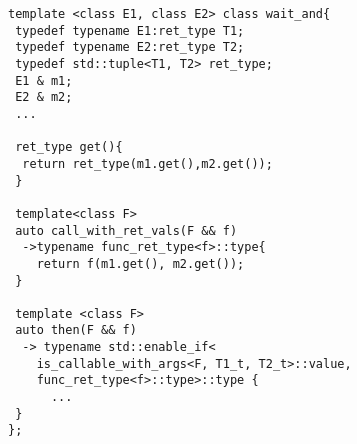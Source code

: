   \begin{lstlisting}[mathescape]
template <class E1, class E2> class wait_and{
 typedef typename E1:ret_type T1;
 typedef typename E2:ret_type T2;
 typedef std::tuple<T1, T2> ret_type;
 E1 & m1;
 E2 & m2;
 ...

 ret_type get(){
  return ret_type(m1.get(),m2.get());
 }

 template<class F>
 auto call_with_ret_vals(F && f)
  ->typename func_ret_type<f>::type{
    return f(m1.get(), m2.get());
 }

 template <class F>
 auto then(F && f)
  -> typename std::enable_if<
    is_callable_with_args<F, T1_t, T2_t>::value,
    func_ret_type<f>::type>::type {
      ...
 }
};
  \end{lstlisting}
